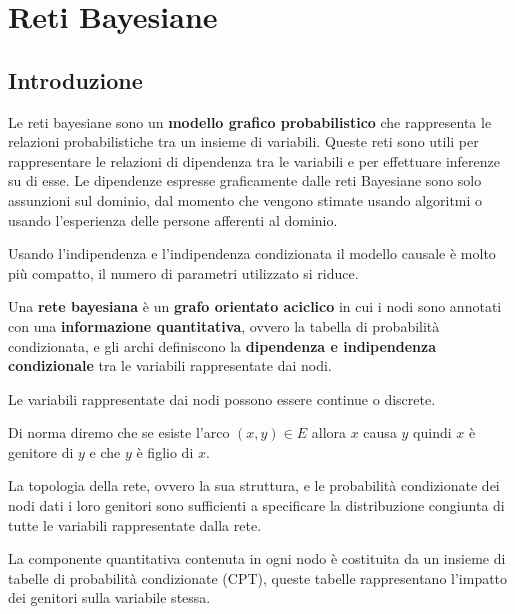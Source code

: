 \chapter{Reti Bayesiane} \label{cap:RetiBayesiane}
\section{Introduzione}
Le reti bayesiane sono un \textbf{modello grafico probabilistico} che rappresenta
le relazioni probabilistiche tra un insieme di variabili. Queste reti sono utili
per rappresentare le relazioni di dipendenza tra le variabili e per effettuare
inferenze su di esse. Le dipendenze espresse graficamente dalle reti Bayesiane sono
solo assunzioni sul dominio, dal momento che vengono stimate usando algoritmi o
usando l'esperienza delle persone afferenti al dominio.

Usando l'indipendenza e l'indipendenza condizionata il modello causale è molto
più compatto, il numero di parametri utilizzato si riduce.
\begin{definizione}
    Una \textbf{rete bayesiana} è un \textbf{grafo orientato aciclico} in cui i nodi sono
    annotati con una \textbf{informazione quantitativa}, ovvero la tabella di probabilità
    condizionata, e gli archi definiscono la \textbf{dipendenza e indipendenza condizionale}
    tra le variabili rappresentate dai nodi.
\end{definizione}
\begin{nota}
    Le variabili rappresentate dai nodi possono essere continue o discrete.
\end{nota}

Di norma diremo che se esiste l'arco $(x,y)\in E$ allora $x$ causa $y$ quindi
$x$ è genitore di $y$ e che $y$ è figlio di $x$.
\begin{center}
\end{center}

La topologia della rete, ovvero la sua struttura, e le probabilità condizionate
dei nodi dati i loro genitori sono sufficienti a specificare la distribuzione
congiunta di tutte le variabili rappresentate dalla rete.

La componente quantitativa contenuta in ogni nodo è costituita da un insieme di
tabelle di probabilità condizionate (CPT), queste tabelle rappresentano l'impatto
dei genitori sulla variabile stessa.

